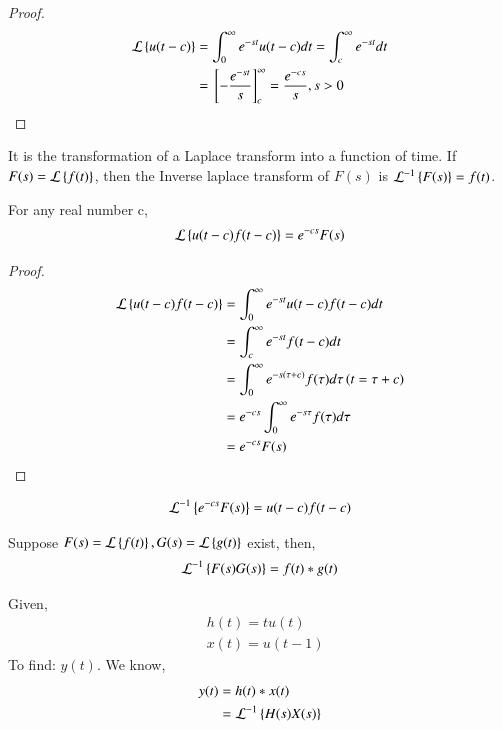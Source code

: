 \begin{proof}
 \begin{align}
     \mathcal{L}\left\{u(t-c)\right\}&=\int_{0}^{\infty}e^{-st}u(t-c)dt=\int_{c}^{\infty}e^{-st}dt\\
     &={}\left[-\dfrac{e^{-st}}{s}\right]_{c}^{\infty}=\dfrac{e^{-cs}}{s}, s>0
 \end{align}
\end{proof}
\begin{definition}
It is the transformation of a Laplace transform into a function of time. If $F(s)=\mathcal{L}\left\{f(t)\right\}$, then the Inverse laplace transform of $F(s)$ is $\mathcal{L}^{-1}\left\{F(s)\right\}=f(t)$.
\end{definition}
\begin{lemma}
For any real number c,
\begin{align}
    \mathcal{L}\left\{u(t-c)f(t-c)\right\}=e^{-cs}F(s)
    \label{ec/2013/8eq:uf}
\end{align}
\end{lemma}
\begin{proof}
\begin{align}
    \mathcal{L}\left\{u(t-c)f(t-c)\right\}&=\int_{0}^{\infty}e^{-st}u(t-c)f(t-c)dt\\
    &=\int_{c}^{\infty}e^{-st}f(t-c)dt\\
    &=\int_{0}^{\infty}e^{-s(\tau+c)}f(\tau)d\tau \left(t=\tau+c\right)\\
    &=e^{-cs}\int_{0}^{\infty}e^{-s\tau}f(\tau)d\tau\\
    &=e^{-cs}F(s)
\end{align}
\end{proof}
\begin{corollary}
\begin{align}
    \mathcal{L}^{-1}\left\{e^{-cs}F(s)\right\}=u(t-c)f(t-c)
\end{align}
\end{corollary}
\begin{theorem}
Suppose $F(s)=\mathcal{L}\left\{f(t)\right\}, G(s)=\mathcal{L}\left\{g(t)\right\}$ exist, then,
\begin{align}
    \mathcal{L}^{-1}\left\{F(s)G(s)\right\}=f(t)*g(t)\label{ec/2013/8eq:cuf}
\end{align}
\end{theorem}
Given,
\begin{align}
    &h(t)=tu(t)\\
    &x(t)=u(t-1)
\end{align}
To find: $y(t)$. We know, 
\begin{align}
y(t)&=h(t)*x(t)\\
&=\mathcal{L}^{-1}\left\{H(s)X(s)\right\}
\label{ec/2013/8eq:def}
\end{align}
